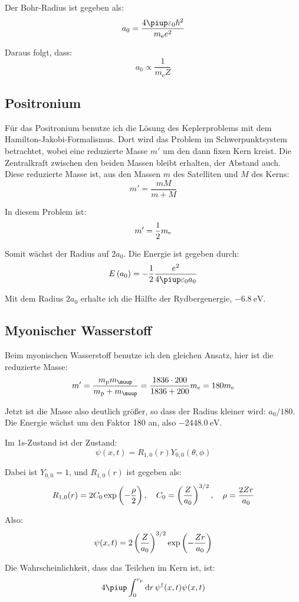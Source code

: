 Der Bohr-Radius ist gegeben als:
\[
	a_0 = \frac{4 \piup \varepsilon_0 \hbar^2}{m_\text e e^2}
\]

Daraus folgt, dass:
\[
	a_0 \propto \frac{1}{m_\text{e} Z}
\]

\subsection{Positronium}

Für das Positronium benutze ich die Lösung des Keplerproblems mit
dem Hamilton-Jakobi-Formalismus. Dort wird das Problem im Schwerpunktsystem
betrachtet, wobei eine reduzierte Masse $m'$ um den dann fixen Kern kreist. Die
Zentralkraft zwischen den beiden Massen bleibt erhalten, der Abstand auch.
Diese reduzierte Masse ist, aus den Massen $m$ des Satelliten und $M$ des
Kerns:
\[
	m' = \frac{m M}{m + M}
\]

In diesem Problem ist:
\[
	m' = \frac 12 m_\text e
\]

Somit wächst der Radius auf $2a_0$. Die Energie ist gegeben durch:
\[
	E\del{a_0} = -\half \frac{e^2}{4\piup\varepsilon_0 a_0}
\]

Mit dem Radius $2a_0$ erhalte ich die Hälfte der Rydbergenergie,
$\SI{-6.8}\electronvolt$.

\subsection{Myonischer Wasserstoff}

Beim myonischen Wasserstoff benutze ich den gleichen Ansatz, hier ist die reduzierte Masse:
\[
	m' = \frac{m_\text p m_\muup}{m_\text p + m_\muup} = \frac{\num{1836} \cdot 200}{\num{1836} + 200} m_\text e
	= 180 m_\text e
\]

Jetzt ist die Masse also deutlich größer, so dass der Radius kleiner wird:
$a_0 / 180$. Die Energie wächst um den Faktor \num{180} an, also
$\SI{-2448.0}\electronvolt$.

Im 1s-Zustand ist der Zustand:
\[
	\psi(x, t) = R_{1,0}(r) Y_{0, 0}(\theta, \phi)
\]

Dabei ist $Y_{0, 0} = 1$, und $R_{1,0}(r)$ ist gegeben als:
\[
	R_{1,0}(r) = 2 C_0 \exp\del{- \frac{\rho}{2}}
	\eqnsep
	C_0 = \del{\frac Z{a_0}}^{3/2}
	\eqnsep
	\rho = \frac{2Zr}{a_0}
\]

Also:
\[
	\psi(x, t) = 2 \del{\frac Z{a_0}}^{3/2} \exp\del{- \frac{Zr}{a_0}}
\]

Die Wahrscheinlichkeit, dass das Teilchen im Kern ist, ist:
\[
	4 \piup \int_0^{r_{\text p}} \dif r \, \psi^\dagger(x, t) \psi(x, t)
\]

